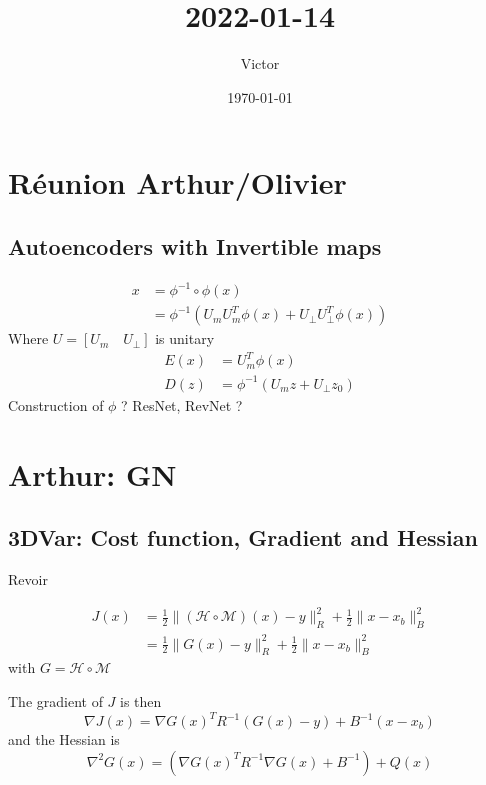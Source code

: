 \documentclass[11pt]{article}
\author{Victor}
\date{\today}
\title{2022-01-14}
\begin{document}
\maketitle
\tableofcontents

\section{Réunion Arthur/Olivier}
\label{sec:org45dd951}
\subsection{Autoencoders with Invertible maps}
\label{sec:orgefb5202}

\begin{align}
x &= \phi^{-1} \circ \phi(x) \\
&= \phi^{-1} \left(U_m U_m^T \phi(x) + U_{\bot}U_{\bot}^T \phi(x)\right)
\end{align}
Where \(U=\left[U_m \quad U_{\bot}\right]\) is unitary
\begin{align}
E(x) & = U_m^T \phi(x) \\
D(z) &= \phi^{-1}(U_m z + U_{\bot}z_0)
\end{align}
Construction of \(\phi\) ? ResNet, RevNet ?

\section{Arthur: GN}
\label{sec:orgf9e3559}
\subsection{3DVar: Cost function, Gradient and Hessian}
\label{sec:orgf748139}
Revoir \cite{gratton_approximate_2007}

\begin{align}
J(x) &= \frac{1}{2}\|(\mathcal{H}\circ \mathcal{M})(x) - y \|^2_{R} +\frac{1}{2} \|x - x_b \|^2_{B}\\
&= \frac{1}{2}\|G(x) - y \|^2_{R} + \frac{1}{2}\|x - x_b \|^2_{B}
\end{align}
with \(G = \mathcal{H} \circ \mathcal{M}\)

The gradient of \(J\) is then
\begin{equation}
\nabla J(x) =
\nabla G(x)^TR^{-1}\left(G(x) - y\right) + B^{-1} (x - x_b)
\end{equation}
and the Hessian is
 \begin{equation}
\nabla^2 G(x) = \left(\nabla G(x)^T R^{-1} \nabla G(x) + B^{-1}\right) + Q(x)
\end{equation}
\end{document}
